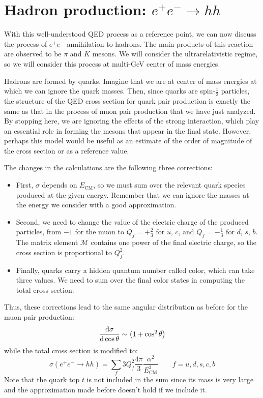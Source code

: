 \documentclass[../../main/main.tex]{subfiles}
\begin{document}

\section{Hadron production: \( e^+e^- \rightarrow hh \)}
With this well-understood QED process as a reference point, we can now discuss the process of \( e^+e^- \) annihilation to hadrons. The main products of this reaction are observed to be \( \pi \) and \( K \) mesons. We will consider the ultrarelativistic regime, so we will consider this process at multi-GeV center of mass energies.

Hadrons are formed by quarks. Imagine that we are at center of mass energies at which we can ignore the quark masses. Then, since quarks are spin-\( \frac{1}{2} \) particles, the structure of the QED cross section for quark pair production is exactly the same as that in the process of muon pair production that we have just analyzed. By stopping here, we are ignoring the effects of the strong interaction, which play an essential role in forming the mesons that appear in the final state. However, perhaps this model would be useful as an estimate of the order of magnitude of the cross section or as a reference value.

The changes in the calculations are the following three corrections:
\begin{itemize}
	\item First, \( \sigma \) depends on \( E_\mathrm{CM} \), so we must sum over the relevant quark species produced at the given energy. Remember that we can ignore the masses at the energy we consider with a good approximation.
	\item Second, we need to change the	value of the electric charge of the produced particles, from \( -1 \) for the muon to \( Q_f = + \frac{2}{3} \) for \( u \), \( c \), and \( Q_f = - \frac{1}{3} \) for \( d \), \( s \), \( b \). The matrix element \( \mathcal{M} \) contains one power of the final electric charge, so the cross section is proportional to \( Q^2_f \).
	\item Finally, quarks carry a hidden quantum number called color, which can take three values. We need to sum over the final color states in computing the total cross section.
\end{itemize}
Thus, these corrections lead to the same angular distribution as before for the muon pair production:
\begin{equation}
	\dv{\sigma}{\cos \theta} (e^+e^- \longrightarrow hh)
	\sim
	\qty(1 + \cos^2 \theta)
	\label{eq:L07_HPDCS}
\end{equation}
while the total cross section is modified to:
\begin{equation}
	\sigma(e^+e^- \longrightarrow hh)
	=
	\sum_{f} 3 Q_f^2 \frac{4\pi}{3} \frac{\alpha^2}{E^2_\mathrm{CM}}
	\qquad
	f = u, d, s, c, b
	\label{eq:L07_HPCS}
\end{equation}
Note that the quark top \( t \) is not included in the sum since its mass is very large and the approximation made before doesn't hold if we include it.
\end{document}
